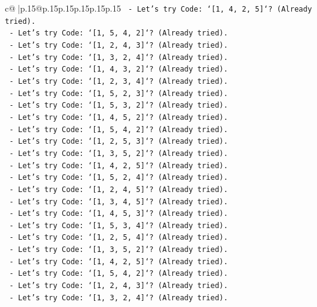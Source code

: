 \documentclass{article}
\begin{document}
{\begin{supertabular}{c@{$\;$}|p{.15\linewidth}@{}p{.15\linewidth}p{.15\linewidth}p{.15\linewidth}p{.15\linewidth}p{.15\linewidth}}
{{{\texttt{    {-} Let's try Code: `{[}1, 4, 2, 5{]}`? (Already tried).} \\
\texttt{    {-} Let's try Code: `{[}1, 5, 4, 2{]}`? (Already tried).} \\
\texttt{    {-} Let's try Code: `{[}1, 2, 4, 3{]}`? (Already tried).} \\
\texttt{    {-} Let's try Code: `{[}1, 3, 2, 4{]}`? (Already tried).} \\
\texttt{    {-} Let's try Code: `{[}1, 4, 3, 2{]}`? (Already tried).} \\
\texttt{    {-} Let's try Code: `{[}1, 2, 3, 4{]}`? (Already tried).} \\
\texttt{    {-} Let's try Code: `{[}1, 5, 2, 3{]}`? (Already tried).} \\
\texttt{    {-} Let's try Code: `{[}1, 5, 3, 2{]}`? (Already tried).} \\
\texttt{    {-} Let's try Code: `{[}1, 4, 5, 2{]}`? (Already tried).} \\
\texttt{    {-} Let's try Code: `{[}1, 5, 4, 2{]}`? (Already tried).} \\
\texttt{    {-} Let's try Code: `{[}1, 2, 5, 3{]}`? (Already tried).} \\
\texttt{    {-} Let's try Code: `{[}1, 3, 5, 2{]}`? (Already tried).} \\
\texttt{    {-} Let's try Code: `{[}1, 4, 2, 5{]}`? (Already tried).} \\
\texttt{    {-} Let's try Code: `{[}1, 5, 2, 4{]}`? (Already tried).} \\
\texttt{    {-} Let's try Code: `{[}1, 2, 4, 5{]}`? (Already tried).} \\
\texttt{    {-} Let's try Code: `{[}1, 3, 4, 5{]}`? (Already tried).} \\
\texttt{    {-} Let's try Code: `{[}1, 4, 5, 3{]}`? (Already tried).} \\
\texttt{    {-} Let's try Code: `{[}1, 5, 3, 4{]}`? (Already tried).} \\
\texttt{    {-} Let's try Code: `{[}1, 2, 5, 4{]}`? (Already tried).} \\
\texttt{    {-} Let's try Code: `{[}1, 3, 5, 2{]}`? (Already tried).} \\
\texttt{    {-} Let's try Code: `{[}1, 4, 2, 5{]}`? (Already tried).} \\
\texttt{    {-} Let's try Code: `{[}1, 5, 4, 2{]}`? (Already tried).} \\
\texttt{    {-} Let's try Code: `{[}1, 2, 4, 3{]}`? (Already tried).} \\
\texttt{    {-} Let's try Code: `{[}1, 3, 2, 4{]}`? (Already tried).} \\
}}}
\end{supertabular}}
\end{document}
